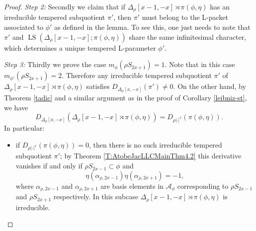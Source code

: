 \documentclass[11pt,letterpaper]{amsart}
\theoremstyle{plain}
\numberwithin{theorem}{section}
\numberwithin{equation}{subsection}
\theoremstyle{remark}
\newcommand{\LS}{\operatorname{LS}} %
\def\calA{\mathcal{A}}
\begin{document}
\begin{proof}
\vskip 5pt

\emph{Step 2:} Secondly we claim that if $\Delta_\rho\left[x-1,-x\right]\rtimes \pi\left(\phi,\eta\right)$ has an irreducible tempered subquotient $\pi'$, then $\pi'$ must belong to the L-packet associated to $\phi'$ as defined in the lemma. To see this, one just needs to note that $\pi'$ and $\LS\left(\Delta_\rho\left[x-1,-x\right];\pi\left(\phi,\eta\right)\right)$ share the same infinitesimal character, which determines a unique tempered L-parameter $\phi'$.

\vskip 5pt

\vskip 5pt

\emph{Step 3:} Thirdly we prove the case $m_\phi\left(\rho S_{2x+1}\right)=1$. Note that in this case $m_{\phi'}\left(\rho S_{2x+1}\right)=2$. Therefore any irreducible tempered subquotient $\pi'$ of $\Delta_\rho\left[x-1,-x\right]\rtimes \pi\left(\phi,\eta\right)$ satisfies $D_{\Delta_\rho[x,-x]}\left(\pi'\right)\neq 0$. On the other hand, by Theorem \ref{tadic} and a similar argument as in the proof of Corollary \ref{leibniz-st}, we have
\[
    D_{\Delta_\rho[x,-x]}\left(\Delta_\rho\left[x-1,-x\right]\rtimes \pi\left(\phi,\eta\right)\right) = D_{\rho|\cdot|^x}\left(\pi\left(\phi,\eta\right)\right).
\]
In particular: 
\begin{itemize}
    \item if $D_{\rho|\cdot|^x}\left(\pi\left(\phi,\eta\right)\right)=0$, then there is no such irreducible tempered subquotient $\pi'$; by Theorem \ref{T:AtobeJacLLCMainThm4.2} this derivative vanishes if and only if $\rho S_{2x-1}\subset \phi$ and
    \[
        \eta\left(\alpha_{\rho,2x-1}\right)\eta\left(\alpha_{\rho,2x+1}\right)=-1,
    \]
    where $\alpha_{\rho,2x-1}$ and $\alpha_{\rho,2x+1}$ are basis elements in $\calA_\phi$ corresponding to $\rho S_{2x-1}$ and $\rho S_{2x+1}$ respectively. In this subcase $\Delta_\rho\left[x-1,-x\right]\rtimes \pi\left(\phi,\eta\right)$ is irreducible.

    \vskip 5pt


\end{itemize}
\end{proof}
\end{document}
